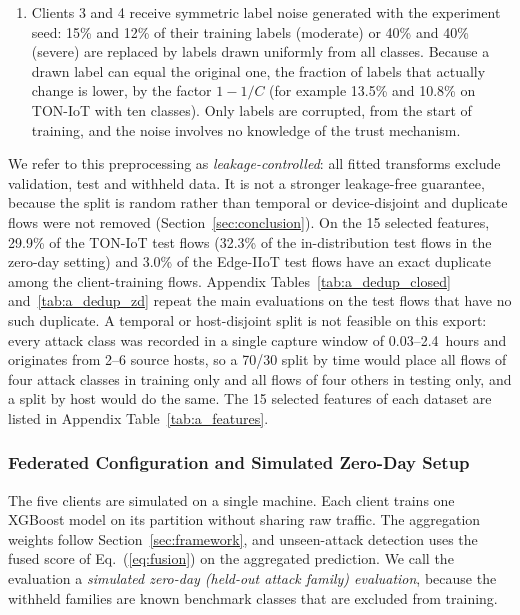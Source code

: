 \documentclass[pdflatex,sn-mathphys-num]{sn-jnl}
\newcommand{\Rtwo}{\color{blue}}
\begin{document}
{{\begin{enumerate}
\item Clients 3 and 4 receive symmetric label noise generated with the experiment seed: 15\% and 12\% of their training labels (moderate) or 40\% and 40\% (severe) are replaced by labels drawn uniformly from all classes. Because a drawn label can equal the original one, the fraction of labels that actually change is lower, by the factor $1-1/C$ (for example 13.5\% and 10.8\% on TON-IoT with ten classes). Only labels are corrupted, from the start of training, and the noise involves no knowledge of the trust mechanism.
\end{enumerate}
We refer to this preprocessing as \emph{leakage-controlled}: all fitted transforms exclude validation, test and withheld data. It is not a stronger leakage-free guarantee, because the split is random rather than temporal or device-disjoint and duplicate flows were not removed (Section~\ref{sec:conclusion}). On the 15 selected features, 29.9\% of the TON-IoT test flows (32.3\% of the in-distribution test flows in the zero-day setting) and 3.0\% of the Edge-IIoT test flows have an exact duplicate among the client-training flows. {\Rtwo Appendix Tables~\ref{tab:a_dedup_closed} and~\ref{tab:a_dedup_zd} repeat the main evaluations on the test flows that have no such duplicate. A temporal or host-disjoint split is not feasible on this export: every attack class was recorded in a single capture window of 0.03--2.4~hours and originates from 2--6 source hosts, so a 70/30 split by time would place all flows of four attack classes in training only and all flows of four others in testing only, and a split by host would do the same.} The 15 selected features of each dataset are listed in Appendix Table~\ref{tab:a_features}.}
\subsubsection{Federated Configuration and Simulated Zero-Day Setup}
The five clients are simulated on a single machine. Each client trains one XGBoost model on its partition without sharing raw traffic. The aggregation weights follow Section~\ref{sec:framework}, and unseen-attack detection uses the fused score of Eq.~(\ref{eq:fusion}) on the aggregated prediction. We call the evaluation a \emph{simulated zero-day (held-out attack family) evaluation}, because the withheld families are known benchmark classes that are excluded from training.

{\color{black}
}}
\end{document}

